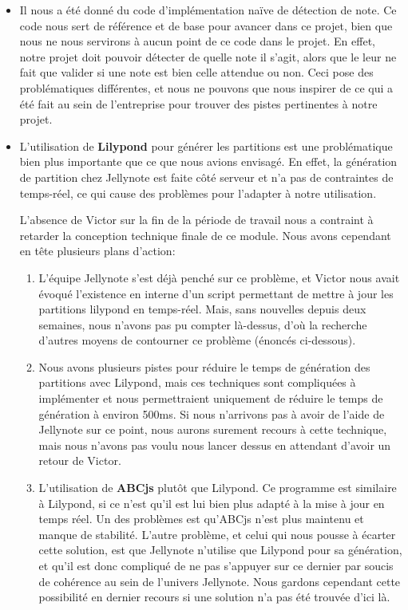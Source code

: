 \documentclass[12pt]{article}
\begin{document}
\begin{itemize}
\item Il nous a été donné du code d'implémentation naïve de détection de note. Ce code nous sert de référence et de base pour avancer dans ce projet, bien que nous ne nous servirons à aucun point de ce code dans le projet. En effet, notre projet doit pouvoir détecter de quelle note il s'agit, alors que le leur ne fait que valider si une note est bien celle attendue ou non. Ceci pose des problématiques différentes, et nous ne pouvons que nous inspirer de ce qui a été fait au sein de l'entreprise pour trouver des pistes pertinentes à notre projet.\\
\item L'utilisation de \textbf{Lilypond} pour générer les partitions est une problématique bien plus importante que ce que nous avions envisagé. En effet, la génération de partition chez Jellynote est faite côté serveur et n'a pas de contraintes de temps-réel, ce qui cause des problèmes pour l'adapter à notre utilisation. \\
\par L'absence de Victor sur la fin de la période de travail nous a contraint à retarder la conception technique finale de ce module. Nous avons cependant en tête plusieurs plans d'action:
\begin{enumerate}

\item L'équipe Jellynote s'est déjà penché sur ce problème, et Victor nous avait évoqué l'existence en interne d'un script permettant de mettre à jour les partitions lilypond en temps-réel. Mais, sans nouvelles depuis deux semaines, nous n'avons pas pu compter là-dessus, d'où la recherche d'autres moyens de contourner ce problème (énoncés ci-dessous).

\item Nous avons plusieurs pistes pour réduire le temps de génération des partitions avec Lilypond, mais ces techniques sont compliquées à implémenter et nous permettraient uniquement de réduire le temps de génération à environ 500ms. Si nous n'arrivons pas à avoir de l'aide de Jellynote sur ce point, nous aurons surement recours à cette technique, mais nous n'avons pas voulu nous lancer dessus en attendant d'avoir un retour de Victor.

\item L'utilisation de \textbf{ABCjs} plutôt que Lilypond. Ce programme est similaire à Lilypond, si ce n'est qu'il est lui bien plus adapté à la mise à jour en temps réel. Un des problèmes est qu'ABCjs n'est plus maintenu et manque de stabilité. L'autre problème, et celui qui nous pousse à écarter cette solution, est que Jellynote n'utilise que Lilypond pour sa génération, et qu'il est donc compliqué de ne pas s'appuyer sur ce dernier par soucis de cohérence au sein de l'univers Jellynote. Nous gardons cependant cette possibilité en dernier recours si une solution n'a pas été trouvée d'ici là. \\



\end{enumerate}
\end{itemize}
\end{document}
